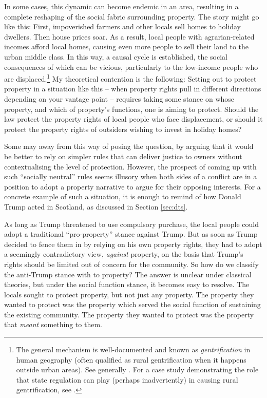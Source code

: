 In some cases, this dynamic can become endemic in an area, resulting in a complete reshaping of the social fabric surrounding property. The story might go like this: First, impoverished farmers and other locals sell homes to holiday dwellers. Then house prices soar. As a result, local people with agrarian-related incomes  afford local homes, causing even more people to sell their land to the urban middle class. In this way, a causal cycle is established, the social consequences of which can be vicious, particularly to the low-income people who are displaced.\footnote{The general mechanism is well-documented and known as {\it gentrification} in human geography (often qualified as rural gentrification when it happens outside urban areas). See generally \cite{weesep94,phillips93,slater06}. For a case study demonstrating the role that state regulation can play (perhaps inadvertently) in causing rural gentrification, see \cite[1027-1030]{darling05}.} My theoretical contention is the following: Setting out to protect property in a situation like this -- when property rights pull in different directions depending on your vantage point -- requires taking some stance on whose property, and which of property's functions, one is aiming to protect. Should the law protect the property rights of local people who face displacement, or should it protect the property rights of outsiders wishing to invest in holiday homes?

Some may  away from this way of posing the question, by arguing that it would be better to rely on simpler rules that can deliver justice to owners without contextualising the level of protection. However, the prospect of coming up with such ``socially neutral'' rules seems illusory when both sides of a conflict are in a position to adopt a property narrative to argue for their opposing interests. For a concrete example of such a situation, it is enough to remind of how Donald Trump acted in Scotland, as discussed in Section \ref{sec:dts}.

As long as Trump threatened to use compulsory purchase, the local people could adopt a traditional ``pro-property'' stance against Trump. But as soon as Trump decided to fence them in by relying on his own property rights, they had to adopt a seemingly contradictory view, {\it against} property, on the basis that Trump's rights should be limited out of concern for the community. So how do we classify the anti-Trump stance with  to property? The answer is unclear under classical theories, but under the social function stance, it becomes easy to resolve. The locals sought to protect property, but not just any property. The property they wanted to protect was the property which served the social function of sustaining the existing community. The property they wanted to protect was the property that {\it meant} something to them.

